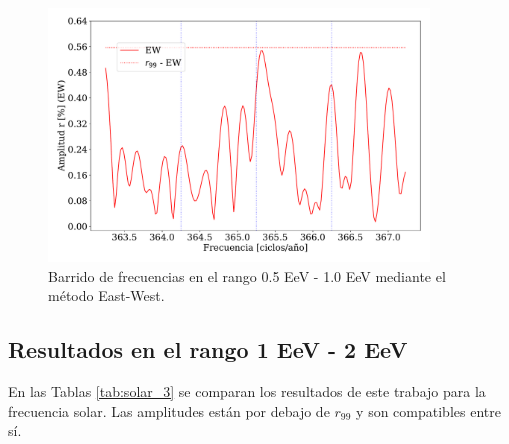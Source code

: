     


    \begin{figure}[H]
        \begin{small}
            \begin{center}
                \vspace*{-1.6 cm}
                \includegraphics[width=0.9\textwidth]{plot_bin_2_barrido_v3_EW.pdf}
                \vspace*{-0.6 cm}
            \end{center}
            \caption{Barrido de frecuencias en el  rango 0.5 EeV - 1.0 EeV mediante el método East-West.}
            \label{fig:segundo_barrido}
        \end{small}
    \end{figure}    

\subsection{Resultados en el rango 1 EeV - 2 EeV}

 
En las Tablas \ref{tab:solar_3}  se comparan los resultados de este trabajo  para la frecuencia solar. Las amplitudes están por debajo de $r_{99}$ y son compatibles entre sí.


